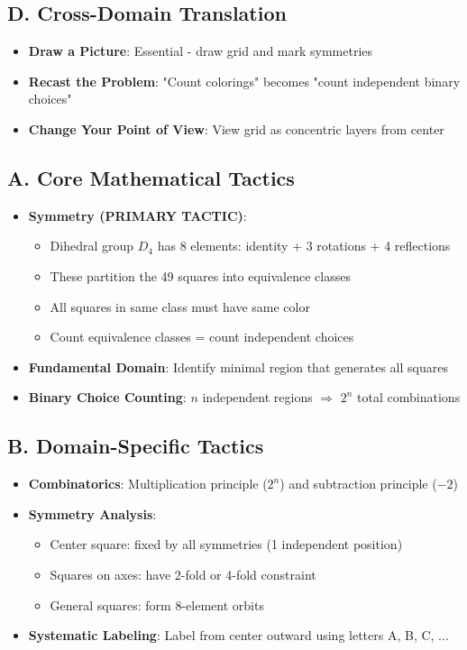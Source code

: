 \documentclass[]{article}
\begin{document}
\begin{strategicbox}
\subsection*{D. Cross-Domain Translation}
\begin{itemize}[leftmargin=*]
    \item \textbf{Draw a Picture}: Essential - draw grid and mark symmetries
    \item \textbf{Recast the Problem}: "Count colorings" becomes "count independent binary choices"
    \item \textbf{Change Your Point of View}: View grid as concentric layers from center
\end{itemize}
\end{strategicbox}

\begin{tacticalbox}
\subsection*{A. Core Mathematical Tactics}
\begin{itemize}[leftmargin=*]
    \item \textbf{Symmetry (PRIMARY TACTIC)}: 
    \begin{itemize}
        \item Dihedral group $D_4$ has 8 elements: identity + 3 rotations + 4 reflections
        \item These partition the 49 squares into equivalence classes
        \item All squares in same class must have same color
        \item Count equivalence classes = count independent choices
    \end{itemize}
    \item \textbf{Fundamental Domain}: Identify minimal region that generates all squares
    \item \textbf{Binary Choice Counting}: $n$ independent regions $\Rightarrow$ $2^n$ total combinations
\end{itemize}

\subsection*{B. Domain-Specific Tactics}
\begin{itemize}[leftmargin=*]
    \item \textbf{Combinatorics}: Multiplication principle ($2^n$) and subtraction principle ($-2$)
    \item \textbf{Symmetry Analysis}:
    \begin{itemize}
        \item Center square: fixed by all symmetries (1 independent position)
        \item Squares on axes: have 2-fold or 4-fold constraint
        \item General squares: form 8-element orbits
    \end{itemize}
    \item \textbf{Systematic Labeling}: Label from center outward using letters A, B, C, ...
\end{itemize}


\end{tacticalbox}
\end{document}
